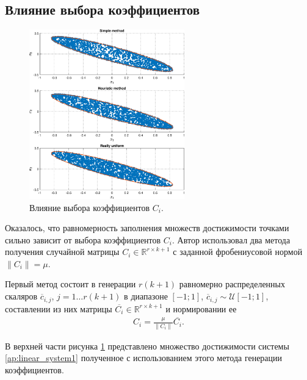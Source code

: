 \documentclass[../main.tex]{subfiles}
\begin{document}
  \subsection{Влияние выбора коэффициентов }
  
     \begin{figure}[ht]
  	\centering
  	\includegraphics[width=0.6\textwidth]{images/three_linear_system_sets.eps}
  	\caption{Влияние выбора коэффициентов $C_i$.}
  	\label{fig:ap:coeffs_RS}
  \end{figure}
  
  Оказалось, что равномерность заполнения множеств достижимости точками сильно зависит от выбора коэффициентов $C_i$. 
  Автор использовал два метода получения случайной матрицы $C_i \in \mathbb{R}^{r \times k+1}$  с заданной фробениусовой нормой $ \|C_i\| = \mu$. 
  
  Первый метод состоит в генерации $r (k + 1)$ равномерно распределенных скаляров $ \overline{c}_{i, j}$, $ j = 1\dots r (k + 1)$ в диапазоне $[-1;1] $,  $\overline{c}_{i, j} \sim \mathcal{U}[-1;1]$, составлении из них матрицы $\overline{C_i}  \in \mathbb{R}^{r \times k+1}$ и нормировании ее
  \begin{gather*}
  		C_i = \frac{\mu}{\|C_i\|}\overline{C_i}.
  \end{gather*}
  
  В верхней части рисунка \ref{fig:ap:coeffs_RS} представлено множество достижимости системы \eqref{ap:linear_system1} полученное с использованием этого метода генерации коэффициентов. 
 
\end{document}
